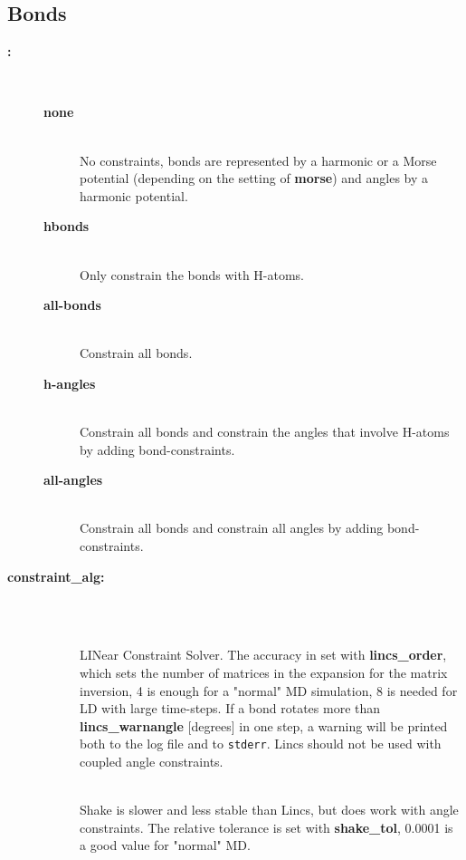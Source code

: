 \subsection{Bonds}
\begin{description}
\item[{\bf {}:}]\mbox{}\\
\vspace{-2ex}\begin{description}
\item[{\bf none}]\mbox{}\\
No constraints, {\ie} bonds are represented by a harmonic or a
Morse potential (depending on the setting of {\bf morse}) and angles
by a harmonic potential.
\item[{\bf hbonds}]\mbox{}\\
Only constrain the bonds with H-atoms.
\item[{\bf all-bonds}]\mbox{}\\
Constrain all bonds.
\item[{\bf h-angles}]\mbox{}\\
Constrain all bonds and constrain the angles that involve H-atoms
by adding bond-constraints.
\item[{\bf all-angles}]\mbox{}\\
Constrain all bonds and constrain all angles by adding bond-constraints.
\end{description}
\item[{\bf constraint\_alg:}]\mbox{}\\
\vspace{-2ex}\begin{description}
\item[]\mbox{}\\
LINear Constraint Solver. The accuracy in set with
{\bf lincs\_order}, which sets the number of matrices in the expansion
for the matrix inversion, 4 is enough for a "normal" MD simulation, 8 is
needed for LD with large time-steps. If a bond rotates more than
{\bf lincs\_warnangle} [degrees] in one step, 
a warning will be printed both to the log file and to {\tt stderr}. 
Lincs should not be used with coupled angle constraints.
\item[]\mbox{}\\
Shake is slower and less stable than Lincs, but does work with 
angle constraints. 
The relative tolerance is set with {\bf shake\_tol}, 0.0001 is a good value
for "normal" MD. 
\end{description}

\end{description}
